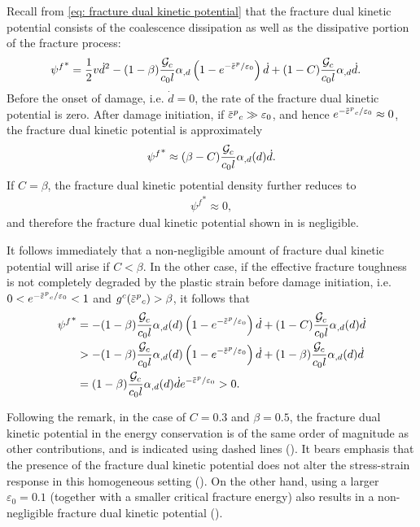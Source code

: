 \begin{remark}
  \vspace{-0.5em}
  Recall from \eqref{eq: fracture dual kinetic potential} that the fracture dual kinetic potential consists of the coalescence dissipation as well as the dissipative portion of the fracture process:
  \begin{align*}
    {\psi^f}^* & = \dfrac{1}{2} v \dot{d}^2 - (1-\beta)\dfrac{\Gc}{c_0l}\alpha_{,d}\left( 1-e^{-\ep/\varepsilon_0} \right)\dot{d} + (1-C) \dfrac{\Gc}{c_0 l}\alpha_{, d}\dot{d}. 
  \end{align*}
  Before the onset of damage, i.e. $\dot{d} = 0$, the rate of the fracture dual kinetic potential is zero. After damage initiation, if $\ep_c \gg \varepsilon_0$, and hence $e^{-\ep_c/\varepsilon_0} \approx 0$, the fracture dual kinetic potential is approximately
  \begin{align*}
    {\psi^f}^* \approx (\beta - C) \dfrac{{\mathcal{G}_c}}{c_0l}\alpha_{,d}(d) \dot{d}.
  \end{align*}
  If $C = \beta$, the fracture dual kinetic potential density further reduces to
  \begin{align*}
    {\psi^f}^* \approx 0,
  \end{align*}
  and therefore the fracture dual kinetic potential shown in  is negligible.
  
  It follows immediately that a non-negligible amount of fracture dual kinetic potential will arise if $C < \beta$.
  In the other case, if the effective fracture toughness is not completely degraded by the plastic strain before damage initiation, i.e. $0 < e^{-\ep_c/\varepsilon_0} < 1$ and $g^c(\ep_c) > \beta$, it follows that
  \begin{align*}
    {\psi^f}^* & = - (1-\beta)\dfrac{\Gc}{c_0l}\alpha_{,d}(d)\left( 1-e^{-\ep/\varepsilon_0} \right)\dot{d} + (1-C) \dfrac{\Gc}{c_0 l}\alpha_{, d}(d)\dot{d}     \\
               & > - (1-\beta)\dfrac{\Gc}{c_0l}\alpha_{,d}(d)\left( 1-e^{-\ep/\varepsilon_0} \right)\dot{d} + (1-\beta) \dfrac{\Gc}{c_0 l}\alpha_{, d}(d)\dot{d} \\
               & = (1-\beta) \dfrac{\Gc}{c_0 l}\alpha_{, d}(d)\dot{d} e^{-\ep/\varepsilon_0} > 0.                                                                
  \end{align*}
\end{remark}

Following the remark, in the case of $C = 0.3$ and $\beta = 0.5$, the fracture dual kinetic potential in the energy conservation is of the same order of magnitude as other contributions, and is indicated using dashed lines ().
It bears emphasis that the presence of the fracture dual kinetic potential does not alter the stress-strain response in this homogeneous setting (). On the other hand, using a larger $\varepsilon_0 = 0.1$ (together with a smaller critical fracture energy) also results in a non-negligible fracture dual kinetic potential ().

